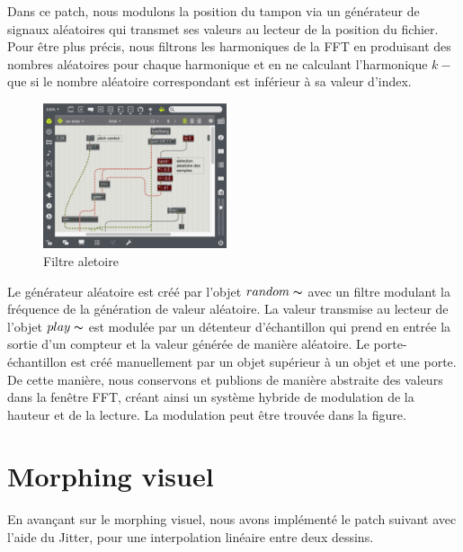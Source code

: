     Dans ce patch, nous modulons la position du tampon via un générateur de signaux aléatoires qui transmet ses valeurs au lecteur de la position du fichier. Pour être plus précis, nous filtrons les harmoniques de la FFT en produisant des nombres aléatoires pour chaque harmonique et en ne calculant l'harmonique $ k-$ que si le nombre aléatoire correspondant est inférieur à sa valeur d'index.

\begin{figure}
  \vspace{-20pt}
  \begin{center}
    \includegraphics[width=0.48\textwidth]{Graphs/random_sampling.png}
  \end{center}
  \vspace{-20pt}
  \caption{Filtre aletoire}
  \vspace{-10pt}
\end{figure}

    Le générateur aléatoire est créé par l'objet $ random \thicksim $ avec un filtre modulant la fréquence de la génération de valeur aléatoire. La valeur transmise au lecteur de l'objet $ play \thicksim $ est modulée par un détenteur d'échantillon qui prend en entrée la sortie d'un compteur et la valeur générée de manière aléatoire. Le porte-échantillon est créé manuellement par un objet supérieur à un objet et une porte. De cette manière, nous conservons et publions de manière abstraite des valeurs dans la fenêtre FFT, créant ainsi un système hybride de modulation de la hauteur et de la lecture. La modulation peut être trouvée dans la figure.
    

\section{Morphing visuel}

En avançant sur le morphing visuel, nous avons implémenté le patch suivant avec l’aide du Jitter, pour une interpolation linéaire entre deux dessins.

